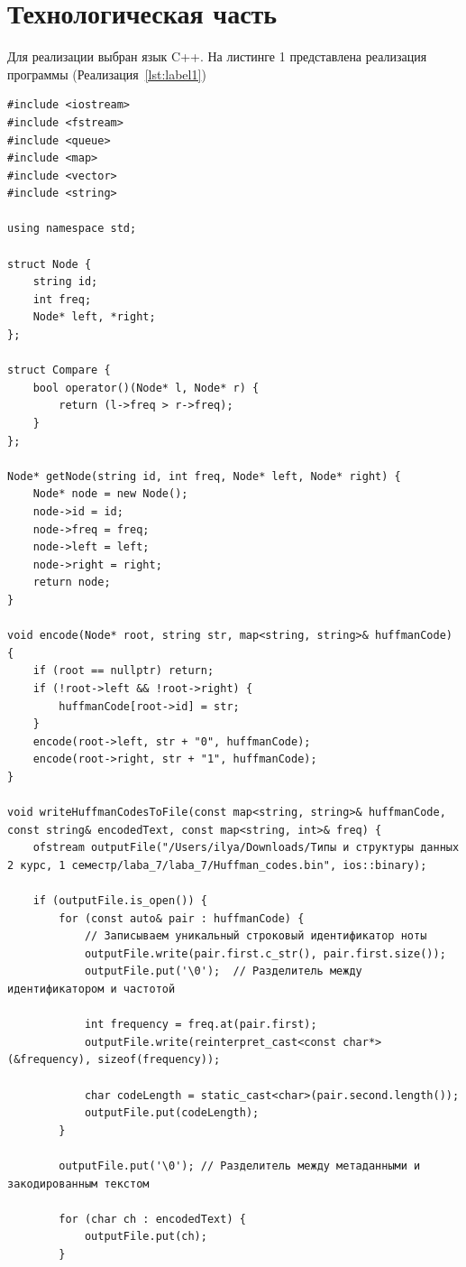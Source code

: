 \documentclass[12pt, a4paper]{article}
\begin{document}
\section{Технологическая часть}
Для реализации выбран язык C++.
На листинге 1 представлена реализация программы
(Реализация~\ref{lst:label1})
\begin{lstlisting}[caption={Исходный код}, label={lst:label1}]
#include <iostream>
#include <fstream>
#include <queue>
#include <map>
#include <vector>
#include <string>

using namespace std;

struct Node {
    string id;
    int freq;
    Node* left, *right;
};

struct Compare {
    bool operator()(Node* l, Node* r) {
        return (l->freq > r->freq);
    }
};

Node* getNode(string id, int freq, Node* left, Node* right) {
    Node* node = new Node();
    node->id = id;
    node->freq = freq;
    node->left = left;
    node->right = right;
    return node;
}

void encode(Node* root, string str, map<string, string>& huffmanCode) {
    if (root == nullptr) return;
    if (!root->left && !root->right) {
        huffmanCode[root->id] = str;
    }
    encode(root->left, str + "0", huffmanCode);
    encode(root->right, str + "1", huffmanCode);
}

void writeHuffmanCodesToFile(const map<string, string>& huffmanCode, const string& encodedText, const map<string, int>& freq) {
    ofstream outputFile("/Users/ilya/Downloads/Типы и структуры данных 2 курс, 1 семестр/laba_7/laba_7/Huffman_codes.bin", ios::binary);

    if (outputFile.is_open()) {
        for (const auto& pair : huffmanCode) {
            // Записываем уникальный строковый идентификатор ноты
            outputFile.write(pair.first.c_str(), pair.first.size());
            outputFile.put('\0');  // Разделитель между идентификатором и частотой

            int frequency = freq.at(pair.first);
            outputFile.write(reinterpret_cast<const char*>(&frequency), sizeof(frequency));

            char codeLength = static_cast<char>(pair.second.length());
            outputFile.put(codeLength);
        }

        outputFile.put('\0'); // Разделитель между метаданными и закодированным текстом

        for (char ch : encodedText) {
            outputFile.put(ch);
        }


\end{lstlisting}
\end{document}
